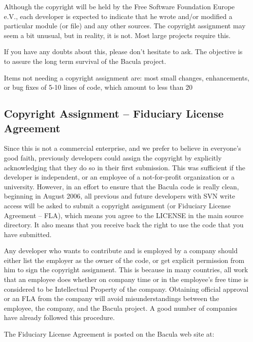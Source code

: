 Although the copyright will be held by the Free Software
Foundation Europe e.V., each developer is expected to indicate
that he wrote and/or modified a particular module (or file) and
any other sources.  The copyright assignment may seem a bit
unusual, but in reality, it is not.  Most large projects require
this.

If you have any doubts about this, please don't hesitate to ask.  The
objective is to assure the long term survival of the Bacula project.

Items not needing a copyright assignment are: most small changes,
enhancements, or bug fixes of 5-10 lines of code, which amount to
less than 20%

\subsection{Copyright Assignment -- Fiduciary License Agreement}

Since this is not a commercial enterprise, and we prefer to believe in
everyone's good faith, previously developers could assign the copyright by
explicitly acknowledging that they do so in their first submission.  This
was sufficient if the developer is independent, or an employee of a
not-for-profit organization or a university.  However, in an effort to
ensure that the Bacula code is really clean, beginning in August 2006, all
previous and future developers with SVN write access will be asked to submit a
copyright assignment (or Fiduciary License Agreement -- FLA),
which means you agree to the LICENSE in the main source
directory. It also means that you receive back the right to use
the code that you have submitted.

Any developer who wants to contribute and is employed by a company should
either list the employer as the owner of the code, or get explicit
permission from him to sign the copyright assignment.  This is because in
many countries, all work that an employee does whether on company time or
in the employee's free time is considered to be Intellectual Property of
the company.  Obtaining official approval or an FLA from the company will
avoid misunderstandings between the employee, the company, and the Bacula
project.  A good number of companies have already followed this procedure.

The Fiduciary License Agreement is posted on the Bacula web site at:

